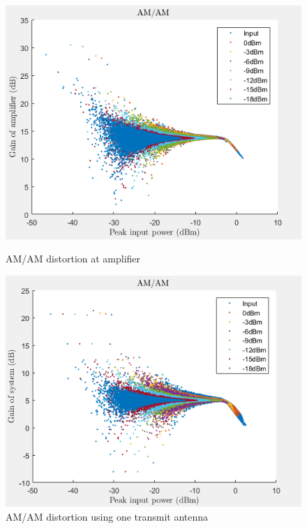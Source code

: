 \begin{figure}[H]
  \centering
  \begin{minipage}[b]{0.5\textwidth}
	\includegraphics[scale = 0.5]{figures/measurement/two_antenna/amplifier_amam.png}
	\caption{AM/AM distortion at amplifier}
    \label{fig:amam_amp}
  \end{minipage}
  \hfill
  \begin{minipage}[b]{0.4\textwidth}
\includegraphics[scale = 0.5]{figures/measurement/two_antenna/one_ant_amam.png}
\caption{AM/AM distortion using one transmit antenna}
    \label{fig:amam_one_ant}
  \end{minipage}
\end{figure}


